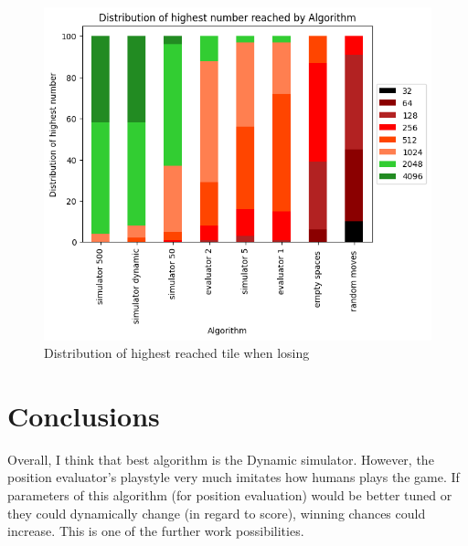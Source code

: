 \documentclass[sigconf,nonacm]{acmart}
\begin{document}
\begin{figure}[!ht]
    \centering
    \begin{adjustbox}{scale=0.45}
    \includegraphics{static/distribution_of_highest_reached.png}
    \end{adjustbox}
    \caption{Distribution of highest reached tile when losing}
    \label{fig:dist_of_highest}
\end{figure}

\section{Conclusions}

Overall, I think that best algorithm is the Dynamic simulator. However, the position evaluator's playstyle very much imitates how humans plays the game. If parameters of this algorithm (for position evaluation) would be better tuned or they could dynamically change (in regard to score), winning chances could increase. This is one of the further work possibilities. 




\end{document}
